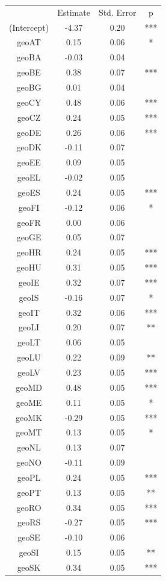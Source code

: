 \documentclass{book}
\begin{document}
\begin{table}[H]
\begin{center}
\begin{tabular}{|c|c|c|c|}
\hline
\rowcolor{lightgray} \multicolumn{4}{|c|}{Coefficients}\\
\hline
&Estimate&Std. Error&p\\
\hline
(Intercept) & -4.37 & 0.20&*** \\
geoAT&0.15&0.06&*\\
geoBA&-0.03&0.04&\\
geoBE&0.38&0.07&***\\
geoBG&0.01&0.04&\\
geoCY&0.48&0.06&***\\
geoCZ&0.24&0.05&***\\
geoDE&0.26&0.06&***\\
geoDK&-0.11&0.07&\\
geoEE&0.09&0.05&\\
geoEL&-0.02&0.05&\\
geoES&0.24&0.05&***\\
geoFI&-0.12&0.06&*\\
geoFR&0.00&0.06&\\
geoGE&0.05&0.07&\\
geoHR&0.24&0.05&***\\
geoHU&0.31&0.05&***\\
geoIE&0.32&0.07&***\\
geoIS&-0.16&0.07&*\\
geoIT&0.32&0.06&***\\
geoLI&0.20&0.07&**\\
geoLT&0.06&0.05&\\
geoLU&0.22&0.09&**\\
geoLV&0.23&0.05&***\\
geoMD&0.48&0.05&***\\
geoME&0.11&0.05&*\\
geoMK&-0.29&0.05&***\\
geoMT&0.13&0.05&*\\
geoNL&0.13&0.07&\\
geoNO&-0.11&0.09&\\
geoPL&0.24&0.05&***\\
geoPT&0.13&0.05&**\\
geoRO&0.34&0.05&***\\
geoRS&-0.27&0.05&***\\
geoSE&-0.10&0.06&\\
geoSI&0.15&0.05&**\\
geoSK&0.34&0.05&***\\

\end{tabular}
\end{center}
\end{table}
\end{document}
